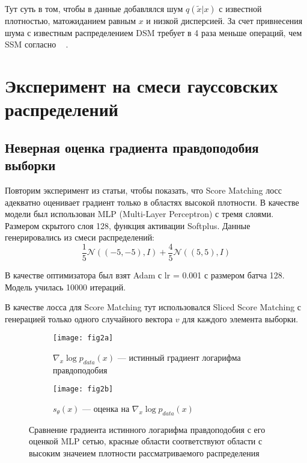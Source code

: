 \documentclass{article}
\begin{document}
Тут суть в том, чтобы в данные добавлялся шум $q(\tilde{x} | x)$ с известной
плотностью, матожиданием равным $x$ и низкой дисперсией.  За счет привнесения шума с известным распределением DSM требует в 4 раза меньше операций, чем SSM согласно ~\cite{DBLP:journals/corr/abs-1907-05600} .



\section{Эксперимент на смеси гауссовских распределений}

\subsection{Неверная оценка градиента правдоподобия выборки}
Повторим эксперимент из статьи, чтобы показать, что Score Matching лосс адекватно
оценивает градиент только в областях высокой плотности. В качестве модели был
использован MLP (Multi-Layer Perceptron) с тремя слоями. Размером скрытого слоя
128, функция активации Softplus. Данные генерировались из смеси распределений:
\[
\frac{1}{5} \mathcal{N}\left( \left( -5, -5\right), I \right)+\frac{4}{5} \mathcal{N}\left( \left( 5, 5\right), I \right)
\]

В качестве оптимизатора был взят Adam с lr = 0.001 с размером батча 128. 
Модель училась 10000 итераций.

В качестве лосса для Score Matching тут использовался Sliced Score Matching с
генерацией только одного случайного вектора $v$ для каждого элемента выборки.

\begin{figure}[H]
	\centering
	\begin{subfigure}[b]{0.45\textwidth}
		\texttt{[image: fig2a]}
		\caption{$\nabla_x \log p_{data}(x)$ --- истинный градиент логарифма правдоподобия}
		\label{fig:2a}
	\end{subfigure}
	\begin{subfigure}[b]{0.45\textwidth}
		\centering
		\texttt{[image: fig2b]}
		\caption{$s_{\theta}(x)$ --- оценка на $\nabla_x \log p_{data}(x)$}
		\label{fig:2b}
	\end{subfigure}
	\caption{Сравнение градиента истинного логарифма правдоподобия с его оценкой
		MLP сетью, красные области соответствуют области с высоким значеием плотности
		рассматриваемого распределения}
	\label{fig:2}
\end{figure}
\end{document}
